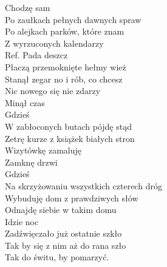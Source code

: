 
\begin{flushleft}
Chodzę sam \tab{}\tab{} \\
Po zaułkach pełnych dawnych spraw\\
Po alejkach parków, które znam  \\
Z wyrzuconych kalendarzy \tab{}  \\
\vskip 3mm
Ref. Pada deszcz \tab{} \\
\hspace{0.9cm}Płaczą przemoknięte hełmy wież \\
\hspace{0.9cm}Stanął zegar no i rób, co chcesz \\
\hspace{0.9cm}Nic nowego się nie zdarzy  \\
\hspace{0.9cm}Minął czas  \tab{}\\
\hspace{0.9cm}Gdzieś  \tab{} \tab{}\\
\hspace{0.9cm}W zabłoconych butach pójdę stąd \\
\hspace{0.9cm}Zetrę kurze z książek białych stron  \\
\hspace{0.9cm}Wizytówkę zamaluję  \tab{}\\
\hspace{0.9cm}Zamknę drzwi  \tab{} \\
\hspace{0.9cm}Gdzieś   \tab{} \tab{} \tab{} \\
\hspace{0.9cm}Na skrzyżowaniu wszystkich czterech dróg  \\
\hspace{0.9cm}Wybuduję dom z prawdziwych słów  \tab{}\\
\hspace{0.9cm}Odnajdę siebie w takim domu \tab{}  \\
\vskip 3mm
Idzie noc \\
Zadźwięczało już ostatnie szkło \\
Tak by się z nim aż do rana szło \\
Tak do świtu, by pomarzyć.  \\

\end{flushleft}
